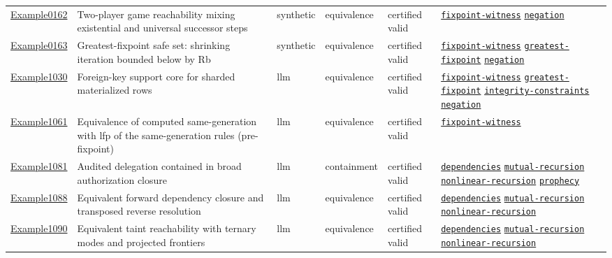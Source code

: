 \documentclass[10pt]{article}
\begin{document}
\begin{longtable}{@{}lp{}p{}p{}p{}p{}@{}}
\hyperref[case:Example0162]{Example0162} & Two-player game reachability mixing existential and universal successor steps & synthetic & equivalence & certified valid & {\scriptsize \hyperref[tag:fixpoint-witness]{\texttt{fixpoint-witness}} \hyperref[tag:negation]{\texttt{negation}}} \\
\hyperref[case:Example0163]{Example0163} & Greatest-fixpoint safe set: shrinking iteration bounded below by Rb & synthetic & equivalence & certified valid & {\scriptsize \hyperref[tag:fixpoint-witness]{\texttt{fixpoint-witness}} \hyperref[tag:greatest-fixpoint]{\texttt{greatest-fixpoint}} \hyperref[tag:negation]{\texttt{negation}}} \\
\hyperref[case:Example1030]{Example1030} & Foreign-key support core for sharded materialized rows & llm & equivalence & certified valid & {\scriptsize \hyperref[tag:fixpoint-witness]{\texttt{fixpoint-witness}} \hyperref[tag:greatest-fixpoint]{\texttt{greatest-fixpoint}} \hyperref[tag:integrity-constraints]{\texttt{integrity-constraints}} \hyperref[tag:negation]{\texttt{negation}}} \\
\hyperref[case:Example1061]{Example1061} & Equivalence of computed same-generation with lfp of the same-generation rules (pre-fixpoint) & llm & equivalence & certified valid & {\scriptsize \hyperref[tag:fixpoint-witness]{\texttt{fixpoint-witness}}} \\
\hyperref[case:Example1081]{Example1081} & Audited delegation contained in broad authorization closure & llm & containment & certified valid & {\scriptsize \hyperref[tag:dependencies]{\texttt{dependencies}} \hyperref[tag:mutual-recursion]{\texttt{mutual-recursion}} \hyperref[tag:nonlinear-recursion]{\texttt{nonlinear-recursion}} \hyperref[tag:prophecy]{\texttt{prophecy}}} \\
\hyperref[case:Example1088]{Example1088} & Equivalent forward dependency closure and transposed reverse resolution & llm & equivalence & certified valid & {\scriptsize \hyperref[tag:dependencies]{\texttt{dependencies}} \hyperref[tag:mutual-recursion]{\texttt{mutual-recursion}} \hyperref[tag:nonlinear-recursion]{\texttt{nonlinear-recursion}}} \\
\hyperref[case:Example1090]{Example1090} & Equivalent taint reachability with ternary modes and projected frontiers & llm & equivalence & certified valid & {\scriptsize \hyperref[tag:dependencies]{\texttt{dependencies}} \hyperref[tag:mutual-recursion]{\texttt{mutual-recursion}} \hyperref[tag:nonlinear-recursion]{\texttt{nonlinear-recursion}}} \\

\end{longtable}
\end{document}
